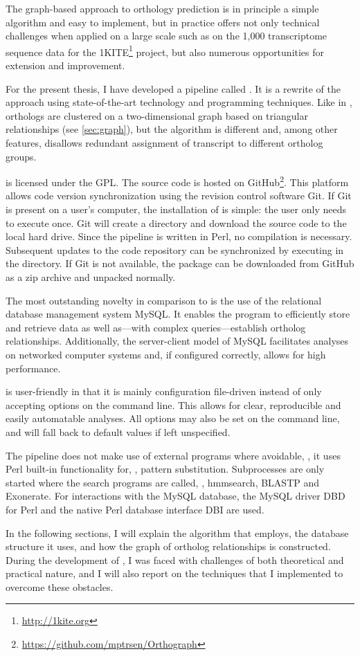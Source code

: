 The graph-based approach to orthology prediction is in principle a simple
algorithm and easy to implement, but in practice offers not only technical
challenges when applied on a large scale such as on the 1,000 transcriptome
sequence data for the 1KITE\footnote{\url{http://1kite.org}} project, but also
numerous opportunities for extension and improvement. 

For the present thesis, I have developed a pipeline called \pname.
It is a rewrite of the \hamstr approach using state-of-the-art technology and
programming techniques. Like in \hamstr, orthologs are clustered on a
two-dimensional graph based on triangular relationships (see
\autoref{sec:graph}), but the algorithm is different and, among other features,
disallows redundant assignment of transcript to different ortholog groups.

\pname is licensed under the GPL. The source code is hosted on
GitHub\footnote{\url{https://github.com/mptrsen/Orthograph}}. This platform
allows code version synchronization using the revision control software Git. If
Git is present on a user's computer, the installation of \pname is simple: the
user only needs to execute  once. Git will create a directory and
download the source code to the local hard drive. Since the pipeline is written
in Perl, no compilation is necessary. Subsequent updates to the code repository
can be synchronized by executing  in the \pname directory. If Git
is not available, the package can be downloaded from GitHub as a zip archive and
unpacked normally.

The most outstanding novelty in comparison to \hamstr is the use of the
relational database management system MySQL. It enables the program to
efficiently store and retrieve data as well as---with complex 
queries---establish ortholog relationships. Additionally, the server-client
model of MySQL facilitates analyses on networked computer systems and, if
configured correctly, allows for high performance.

\pname is user-friendly in that it is mainly configuration file-driven instead
of only accepting options on the command line. This allows for clear,
reproducible and easily automatable analyses. All options may also be set on the
command line, and will fall back to default values if left unspecified.

The pipeline does not make use of external programs where avoidable, \ie, it
uses Perl built-in functionality for, \eg, pattern substitution. Subprocesses
are only started where the search programs are called, \ie, hmmsearch, BLASTP
and Exonerate. For interactions with the MySQL database, the MySQL driver DBD
for Perl and the native Perl database interface DBI are used.

In the following sections, I will explain the algorithm that \pname employs, the
database structure it uses, and how the graph of ortholog relationships is
constructed. During the development of \pname, I was faced with challenges of
both theoretical and practical nature, and I will also report on the techniques
that I implemented to overcome these obstacles.

